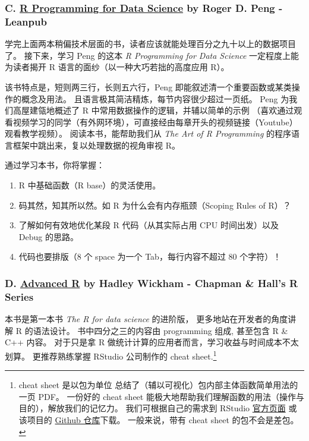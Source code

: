 \documentclass[11pt,hyperref]{ctexart}
\begin{document}
\hypertarget{c.-r-programming-for-data-science-by-roger-d.-peng---leanpub}{%
\subsubsection{\texorpdfstring{C.
\href{https://bookdown.org/rdpeng/rprogdatascience/}{R Programming for
Data Science} by Roger D. Peng -
Leanpub}{C. R Programming for Data Science by Roger D. Peng - Leanpub}}\label{c.-r-programming-for-data-science-by-roger-d.-peng---leanpub}}

学完上面两本稍偏技术层面的书，读者应该就能处理百分之九十以上的数据项目了。
接下来，学习 Peng 的这本 \emph{R Programming for Data Science}
一定程度上能为读者揭开 R 语言的面纱（以一种大巧若拙的高度应用 R）。

该书特点是，短则两三行，长则五六行，Peng
即能叙述清一个重要函数或某类操作的概念及用法。
且语言极其简洁精炼，每节内容很少超过一页纸。 Peng 为我们高屋建瓴地概述了
R 中常用数据操作的逻辑，并辅以简单的示例
（喜欢通过观看视频学习的同学（有外网环境），可直接经由每章开头的视频链接（Youtube）观看教学视频）。
阅读本书，能帮助我们从 \emph{The Art of R Programming}
的程序语言框架中跳出来，复以处理数据的视角审视 R。

通过学习本书，你将掌握：

\begin{enumerate}
\def\labelenumi{\arabic{enumi}.}
\item
  R 中基础函数（R base）的灵活使用。
\item
  码其然，知其所以然。如 R 为什么会有内存瓶颈（Scoping Rules of R）？
\item
  了解如何有效地优化某段 R 代码（从其实际占用 CPU 时间出发）以及 Debug
  的思路。
\item
  代码也要排版（8 个 space 为一个 Tab，每行内容不超过 80 个字符）！
\end{enumerate}

\hypertarget{d.-advanced-r-by-hadley-wickham---chapman-halls-r-series}{%
\subsubsection{\texorpdfstring{D.
\href{https://adv-r.hadley.nz/}{Advanced R} by Hadley Wickham - Chapman
\& Hall's R
Series}{D. Advanced R by Hadley Wickham - Chapman \& Hall's R Series}}\label{d.-advanced-r-by-hadley-wickham---chapman-halls-r-series}}

本书是第一本书 \emph{The R for data science} 的进阶版，
更多地站在开发者的角度讲解 R 的语法设计。 书中四分之三的内容由
programming 组成, 甚至包含 R \& C++ 内容。 对于只是拿 R
做统计计算的应用者而言，学习收益与时间成本不太划算。 更推荐熟练掌握
RStudio 公司制作的 cheat sheet.\footnote{cheat sheet 是以包为单位
  总结了（辅以可视化）包内部主体函数简单用法的一页 PDF。 一份好的 cheat
  sheet 能极大地帮助我们理解函数的用法（操作与目的），解放我们的记忆力。
  我们可根据自己的需求到 RStudio
  \href{https://rstudio.com/resources/cheatsheets/}{官方页面} 或该项目的
  \href{https://github.com/rstudio/cheatsheets}{Github 仓库}下载。
  一般来说，带有 cheat sheet 的包不会是差包。}
\end{document}
